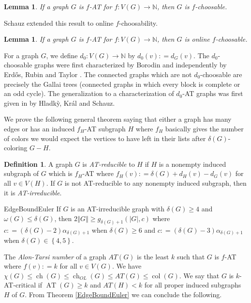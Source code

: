 \documentclass[12pt]{article}
\theoremstyle{plain}
\newtheorem{lem}[thm]{Lemma}
\theoremstyle{definition}
\newtheorem{defn}{Definition}
\theoremstyle{remark}
\newcommand{\IN}{\mathbb{N}}
\newcommand{\set}[1]{\left\{ #1 \right\}}
\newcommand{\card}[1]{\left|#1\right|}
\newcommand{\size}[1]{\left\Vert#1\right\Vert}
\newcommand{\func}[3]{#1\colon #2 \rightarrow #3}
\newcommand{\DefinedAs}{\mathrel{\mathop:}=}
\newcommand{\AT}{\operatorname{AT}}
\newcommand{\col}{\operatorname{col}}
\newcommand{\ch}{\operatorname{ch}}
\begin{document}
\begin{lem}\label{AlonTarsi}
	If a graph $G$ is $f$-AT for $\func{f}{V(G)}{\IN}$, then $G$ is $f$-choosable.
\end{lem}

\noindent Schauz \cite{schauz2010flexible} extended this result to online $f$-choosability.

\begin{lem}\label{Schauz}
	If a graph $G$ is $f$-AT for $\func{f}{V(G)}{\IN}$, then $G$ is online $f$-choosable.
\end{lem}

For a graph $G$, we define $\func{d_0}{V(G)}{\IN}$ by $d_0(v) \DefinedAs d_G(v)$.  The $d_0$-choosable graphs were first characterized by Borodin \cite{borodin1977criterion} and independently by Erd\H{o}s, Rubin and Taylor \cite{erdos1979choosability}.  The connected graphs which are not $d_0$-choosable are precisely the Gallai trees (connected graphs in which every block is complete or an odd cycle). The generalization to a characterization of $d_0$-AT graphs was first given in \cite{Hladky} by Hladk{\`y}, Kr{\'a}l and Schauz. 

We prove the following general theorem saying that either a graph has many edges or has an induced $f_H$-AT subgraph $H$ where $f_H$ basically gives the number of colors we would expect the vertices to have left in their lists after $\delta(G)$-coloring $G-H$.

\begin{defn}
	A graph $G$ is \emph{AT-reducible} to $H$ if $H$ is a nonempty induced subgraph of $G$ which is $f_H$-AT where $f_H(v) \DefinedAs \delta(G) + d_H(v) - d_G(v)$ for all $v \in V(H)$.  
	If $G$ is not AT-reducible to any nonempty induced subgraph, then it is \emph{AT-irreducible}.
\end{defn}

\begin{repthm}{EdgeBoundEuler}
	If $G$ is an AT-irreducible graph with $\delta(G) \ge 4$ and $\omega(G) \le \delta(G)$, then $2\size{G} \ge g_{\delta(G)+1}(\card{G}, c)$ where $c \DefinedAs (\delta(G)-2)\alpha_{\delta(G) + 1}$ when $\delta(G) \ge 6$ and $c \DefinedAs (\delta(G)-3)\alpha_{\delta(G) + 1}$ when $\delta(G) \in \set{4,5}$.
\end{repthm}

The \emph{Alon-Tarsi number} of a graph $AT(G)$ is the least $k$ such that $G$ is $f$-AT where $f(v) \DefinedAs k$ for all $v \in V(G)$. We have $\chi(G) \leq \ch(G) \leq \ch_{OL}(G) \leq AT(G) \leq \col(G)$.  We say that $G$ is $k$-AT-critical if $\AT(G) \ge k$ and $AT(H) < k$ for all proper induced subgraphs $H$ of $G$.  From Theorem \ref{EdgeBoundEuler} we can conclude the following.
\end{document}
